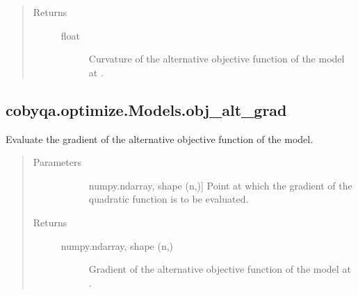 \documentclass[letterpaper,10pt,english]{sphinxmanual}
\begin{document}
\begin{fulllineitems}
\begin{fulllineitems}
\begin{quote}
\begin{description}
\begin{description}
\end{description}

\item[{Returns}] \leavevmode\begin{description}
\item[{float}] \leavevmode
\sphinxAtStartPar
Curvature of the alternative objective function of the model at .

\end{description}

\end{description}\end{quote}

\end{fulllineitems}



\subsection{cobyqa.optimize.Models.obj\_alt\_grad}
\label{\detokenize{refs/generated/cobyqa.optimize.Models.obj_alt_grad:cobyqa-optimize-models-obj-alt-grad}}\label{\detokenize{refs/generated/cobyqa.optimize.Models.obj_alt_grad::doc}}

\begin{fulllineitems}
\label{\detokenize{refs/generated/cobyqa.optimize.Models.obj_alt_grad:cobyqa.optimize.Models.obj_alt_grad}}
\sphinxAtStartPar
Evaluate the gradient of the alternative objective function of the
model.
\begin{quote}\begin{description}
\item[{Parameters}] \leavevmode\begin{description}
\item[{}] \leavevmode{[}numpy.ndarray, shape (n,){]}
\sphinxAtStartPar
Point at which the gradient of the quadratic function is to be
evaluated.

\end{description}

\item[{Returns}] \leavevmode\begin{description}
\item[{numpy.ndarray, shape (n,)}] \leavevmode
\sphinxAtStartPar
Gradient of the alternative objective function of the model at .


\end{description}
\end{description}
\end{quote}
\end{fulllineitems}
\end{fulllineitems}
\end{document}
